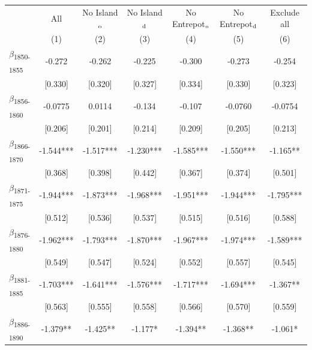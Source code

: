 {
\def\sym#1{\ifmmode^{#1}\else\(^{#1}\)\fi}
\begin{tabular}{l*{6}{c}}
\toprule
            &         All   &No Island$\textsubscript{o}$   &No Island$\textsubscript{d}$   &No Entrepot$\textsubscript{o}$   &No Entrepot$\textsubscript{d}$   & Exclude all   \\
            &\multicolumn{1}{c}{(1)}   &\multicolumn{1}{c}{(2)}   &\multicolumn{1}{c}{(3)}   &\multicolumn{1}{c}{(4)}   &\multicolumn{1}{c}{(5)}   &\multicolumn{1}{c}{(6)}   \\
\midrule
$\beta$\textsubscript{1850-1855}&      -0.272   &      -0.262   &      -0.225   &      -0.300   &      -0.273   &      -0.254   \\
            &     [0.330]   &     [0.320]   &     [0.327]   &     [0.334]   &     [0.330]   &     [0.323]   \\
$\beta$\textsubscript{1856-1860}&     -0.0775   &      0.0114   &      -0.134   &      -0.107   &     -0.0760   &     -0.0754   \\
            &     [0.206]   &     [0.201]   &     [0.214]   &     [0.209]   &     [0.205]   &     [0.213]   \\
$\beta$\textsubscript{1866-1870}&      -1.544***&      -1.517***&      -1.230***&      -1.585***&      -1.550***&      -1.165** \\
            &     [0.368]   &     [0.398]   &     [0.442]   &     [0.367]   &     [0.374]   &     [0.501]   \\
$\beta$\textsubscript{1871-1875}&      -1.944***&      -1.873***&      -1.968***&      -1.951***&      -1.944***&      -1.795***\\
            &     [0.512]   &     [0.536]   &     [0.537]   &     [0.515]   &     [0.516]   &     [0.588]   \\
$\beta$\textsubscript{1876-1880}&      -1.962***&      -1.793***&      -1.870***&      -1.967***&      -1.974***&      -1.589***\\
            &     [0.549]   &     [0.547]   &     [0.524]   &     [0.552]   &     [0.557]   &     [0.545]   \\
$\beta$\textsubscript{1881-1885}&      -1.703***&      -1.641***&      -1.576***&      -1.717***&      -1.694***&      -1.367** \\
            &     [0.563]   &     [0.555]   &     [0.558]   &     [0.566]   &     [0.570]   &     [0.559]   \\
$\beta$\textsubscript{1886-1890}&      -1.379** &      -1.425** &      -1.177*  &      -1.394** &      -1.368** &      -1.061*  \\

\end{tabular}}
